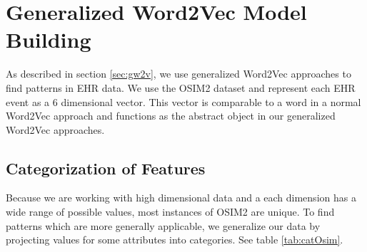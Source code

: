 \section{Generalized Word2Vec Model Building}
\label{sec:convertionClusters}

As described in section \ref{sec:gw2v}, we use generalized Word2Vec approaches to find patterns in EHR data. We use the OSIM2 dataset and represent each EHR event as a $6$ dimensional vector. This vector is comparable to a word in a normal Word2Vec approach and functions as the abstract object in our generalized Word2Vec approaches. 

\subsection{Categorization of Features}
\label{sec:categorizationImpl}

Because we are working with high dimensional data and a each dimension has a wide range of possible values, most instances of OSIM2 are unique. To find patterns which are more generally applicable, we generalize our data by projecting values for some attributes into categories. See table \ref{tab:catOsim}. \\

